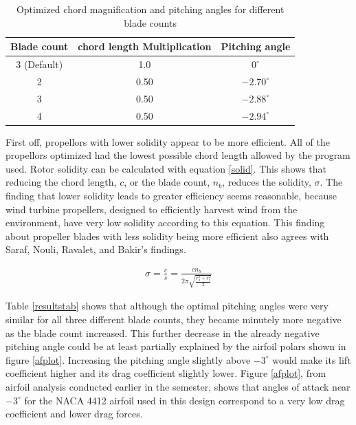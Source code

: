 \documentclass[journal ]{new-aiaa}
\newcounter{ctab}
\begin{document}
\begin{table}[H]
 \centering
 \begin{tabular}{| c | c | c |} \hline
 	 \textbf{Blade count} & \textbf{chord length Multiplication} & \textbf{Pitching angle} \\ \hline
  	 3 (Default) & 1.0 & $0^{\circ}$ \\ \hline
  	 2 & 0.50 & $-2.70^{\circ}$ \\ \hline
  	 3 & 0.50 & $-2.88^{\circ}$ \\ \hline
  	 4 & 0.50 & $-2.94^{\circ}$ \\ \hline
 \end{tabular}
 \caption{Optimized chord magnification and pitching angles for different blade counts}
 \label{ctab}
\end{table}

First off, propellors with lower solidity appear to be more efficient. All of the propellors optimized had the lowest possible chord length allowed by the program used. Rotor solidity can be calculated with equation \ref{solid}. This shows that reducing the chord length, $c$, or the blade count, $n_{b}$, reduces the solidity, $\sigma$. The finding that lower solidity leads to greater efficiency seems reasonable, because wind turbine propellers, designed to efficiently harvest wind from the environment, have very low solidity according to this equation. This finding about propeller blades with less solidity being more efficient also agrees with Saraf, Nouli, Ravalet, and Bakir's findings.\cite{AxFlFan} 

\begin{equation}
	\begin{aligned}
	\sigma = \frac{c}{s} = \frac{c n_{b}}{2 \pi \sqrt{\frac{r_{h}^{2}+r_{t}^{2}}{2}}}
\end{aligned}
\label{solid}
\end{equation}

Table \ref{resultstab} shows that although the optimal pitching angles were very similar for all three different blade counts, they became minutely more negative as the blade count increased. This further decrease in the already negative pitching angle could be at least partially explained by the airfoil polars shown in figure \ref{afplot}. Increasing the pitching angle slightly above $-3^{\circ}$ would make its lift coefficient higher and its drag coefficient slightly lower. Figure \ref{afplot}, from airfoil analysis conducted earlier in the semester, shows that angles of attack near $-3^{\circ}$ for the NACA 4412 airfoil used in this design correspond to a very low drag coefficient and lower drag forces.
\end{document}
